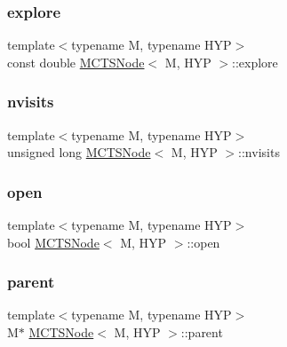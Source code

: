 \subsubsection{\texorpdfstring{explore}{explore}}
{\footnotesize\ttfamily template$<$typename M, typename H\+YP$>$ \\
const double \hyperlink{class_m_c_t_s_node}{M\+C\+T\+S\+Node}$<$ M, H\+YP $>$\+::explore}

\mbox{\label{class_m_c_t_s_node_a277d083d477ab4aaeeadfadada1cdc24}} 
\subsubsection{\texorpdfstring{nvisits}{nvisits}}
{\footnotesize\ttfamily template$<$typename M, typename H\+YP$>$ \\
unsigned long \hyperlink{class_m_c_t_s_node}{M\+C\+T\+S\+Node}$<$ M, H\+YP $>$\+::nvisits}

\mbox{\label{class_m_c_t_s_node_aa4d0f6bb2603cfe995aaafc5d208ec16}} 
\subsubsection{\texorpdfstring{open}{open}}
{\footnotesize\ttfamily template$<$typename M, typename H\+YP$>$ \\
bool \hyperlink{class_m_c_t_s_node}{M\+C\+T\+S\+Node}$<$ M, H\+YP $>$\+::open}

\mbox{\label{class_m_c_t_s_node_ab451a032b940daa976b7a5773d3246ca}} 
\subsubsection{\texorpdfstring{parent}{parent}}
{\footnotesize\ttfamily template$<$typename M, typename H\+YP$>$ \\
M$\ast$ \hyperlink{class_m_c_t_s_node}{M\+C\+T\+S\+Node}$<$ M, H\+YP $>$\+::parent}

\mbox{\label{class_m_c_t_s_node_a47cdbf0ef4f1e6ccbb6e911d4d384f39}} 
